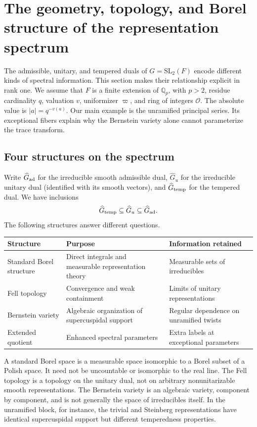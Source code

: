 \section{The geometry, topology, and Borel structure of the representation spectrum}\label{sec:spectral-geometry}
The admissible, unitary, and tempered duals of $G=\mathrm{SL}_2(F)$ encode different kinds of spectral information. This section makes their relationship explicit in rank one. We assume that $F$ is a finite extension of $\mathbb Q_p$, with $p>2$, residue cardinality $q$, valuation $v$, uniformizer $\varpi$, and ring of integers $\mathcal O$. The absolute value is $|a|=q^{-v(a)}$. Our main example is the unramified principal series. Its exceptional fibers explain why the Bernstein variety alone cannot parameterize the trace transform.

\subsection{Four structures on the spectrum}\label{subsec:four-structures}
Write $\widehat G_{\rm ad}$ for the irreducible smooth admissible dual, $\widehat G_u$ for the irreducible unitary dual (identified with its smooth vectors), and $\widehat G_{\rm temp}$ for the tempered dual. We have inclusions
\[\widehat G_{\rm temp}\subseteq\widehat G_u\subseteq\widehat G_{\rm ad}.\]
The following structures answer different questions.
\begin{center}\small
\begin{tabularx}{\linewidth}{@{}p{.23\linewidth}XX@{}}\toprule
Structure & Purpose & Information retained\\\midrule
Standard Borel structure & Direct integrals and measurable representation theory & Measurable sets of irreducibles\\
Fell topology & Convergence and weak containment & Limits of unitary representations\\
Bernstein variety & Algebraic organization of supercuspidal support & Regular dependence on unramified twists\\
Extended quotient & Enhanced spectral parameters & Extra labels at exceptional parameters\\\bottomrule
\end{tabularx}\end{center}
A standard Borel space is a measurable space isomorphic to a Borel subset of a Polish space. It need not be uncountable or isomorphic to the real line. The Fell topology is a topology on the unitary dual, not on arbitrary nonunitarizable smooth representations. The Bernstein variety is an algebraic variety, component by component, and is not generally the space of irreducibles itself. In the unramified block, for instance, the trivial and Steinberg representations have identical supercuspidal support but different temperedness properties.

